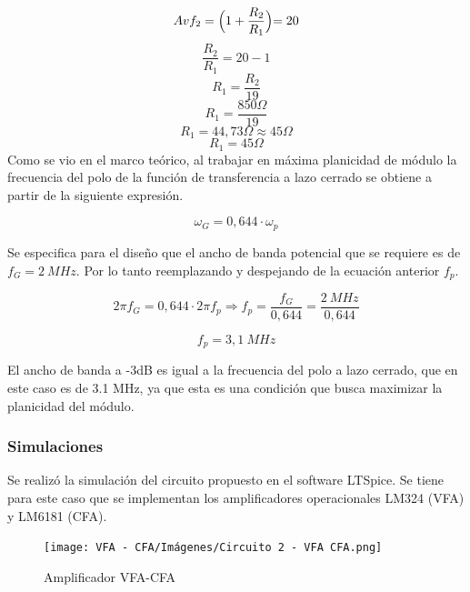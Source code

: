 \begin{equation}
    Avf_2 = \Bigl(1 + \frac{R_2}{R_1}\Bigl) = 20
\end{equation}
\begin{equation}
    \frac{R_2}{R_1} = 20-1
\end{equation}
\begin{equation}
    R_1 =\frac{R_2}{19}
\end{equation}
\begin{equation}
    R_1 =\frac{850\Omega}{19}
\end{equation}
\begin{equation}
    R_1 =44,73\Omega \approx 45\Omega
\end{equation}
\begin{equation}
    \boxed{
    R_1 =45\Omega
    }
\end{equation}
\bigskip
\hspace{1mm} Como se vio en el marco teórico, al trabajar en máxima planicidad de módulo la frecuencia del polo de la función de transferencia a lazo cerrado se obtiene a partir de la siguiente expresión.

\begin{equation}
    \omega _G = 0,644 \cdot \omega _p 
\end{equation}

\bigskip
\hspace{1mm} Se especifica para el diseño que el ancho de banda potencial que se requiere es de \( f_G = 2~MHz \). Por lo tanto reemplazando y despejando de la ecuación anterior \( f_p \).

\begin{equation}
    2\pi f_G = 0,644 \cdot 2\pi f_p \Longrightarrow f_p = \frac{f_G}{0,644} = \frac{2~MHz}{0,644}
\end{equation}

\begin{equation}
    \boxed{
    f_p = 3,1~MHz
    }
\end{equation}

\bigskip
\hspace{1mm} El ancho de banda a -3dB es igual a la frecuencia del polo a lazo cerrado, que en este caso es de 3.1 MHz, ya que esta es una condición que busca maximizar la planicidad del módulo.

\subsubsection{Simulaciones}

\hspace{1mm} Se realizó la simulación del circuito propuesto en el software LTSpice. Se tiene para este caso que se implementan los amplificadores operacionales LM324 (VFA) y LM6181 (CFA).
\begin{figure}[!h]
    \centering
    \texttt{[image: VFA - CFA/Imágenes/Circuito 2 - VFA CFA.png]}
    \caption{Amplificador VFA-CFA}
    
\end{figure}
    
